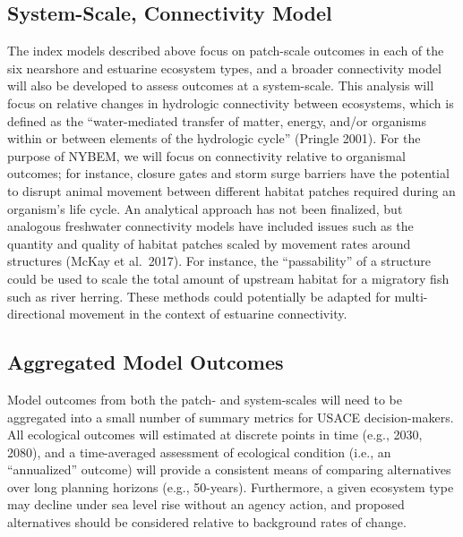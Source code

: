 \documentclass[
]{book}
\begin{document}
\hypertarget{system-scale-connectivity-model}{%
\subsection{System-Scale, Connectivity Model}\label{system-scale-connectivity-model}}

The index models described above focus on patch-scale outcomes in each of the six nearshore and estuarine ecosystem types, and a broader connectivity model will also be developed to assess outcomes at a system-scale. This analysis will focus on relative changes in hydrologic connectivity between ecosystems, which is defined as the ``water-mediated transfer of matter, energy, and/or organisms within or between elements of the hydrologic cycle'' (Pringle 2001). For the purpose of NYBEM, we will focus on connectivity relative to organismal outcomes; for instance, closure gates and storm surge barriers have the potential to disrupt animal movement between different habitat patches required during an organism's life cycle. An analytical approach has not been finalized, but analogous freshwater connectivity models have included issues such as the quantity and quality of habitat patches scaled by movement rates around structures (McKay et al.~2017). For instance, the ``passability'' of a structure could be used to scale the total amount of upstream habitat for a migratory fish such as river herring. These methods could potentially be adapted for multi-directional movement in the context of estuarine connectivity.

\hypertarget{aggregated-model-outcomes}{%
\subsection{Aggregated Model Outcomes}\label{aggregated-model-outcomes}}

Model outcomes from both the patch- and system-scales will need to be aggregated into a small number of summary metrics for USACE decision-makers. All ecological outcomes will estimated at discrete points in time (e.g., 2030, 2080), and a time-averaged assessment of ecological condition (i.e., an ``annualized'' outcome) will provide a consistent means of comparing alternatives over long planning horizons (e.g., 50-years). Furthermore, a given ecosystem type may decline under sea level rise without an agency action, and proposed alternatives should be considered relative to background rates of change.

\hypertarget{appendix-appendices}{%
\appendix}
\end{document}
